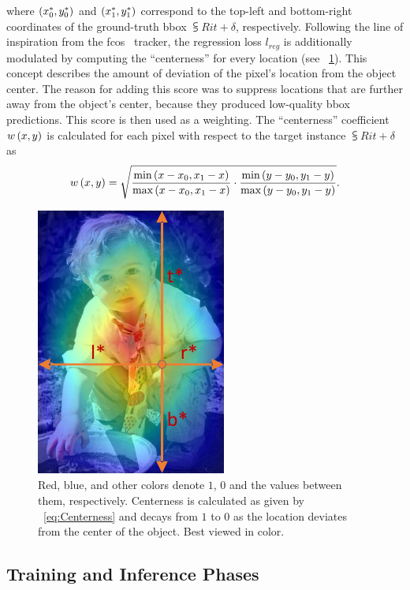 where $\left( {{x}_{0}^{*}, {y}_{0}^{*}} \right)$ and $\left( {{x}_{1}^{*}, {y}_{1}^{*}} \right)$ correspond to the top-left and bottom-right coordinates of the ground-truth \gls{bbox} $\subsup{R}{i}{t + \delta}$, respectively. Following the line of inspiration from the \gls{fcos}~\cite{tian2019fcos} tracker, the regression loss $l_{reg}$ is additionally modulated by computing the ``centerness'' for every location (see \figtext{}~\ref{fig:FCOSCenterness}). This concept describes the amount of deviation of the pixel's location from the object center. The reason for adding this score was to suppress locations that are further away from the object's center, because they produced low-quality \gls{bbox} predictions. This score is then used as a weighting. The ``centerness'' coefficient ${w} \left( x, y \right)$ is calculated for each pixel with respect to the target instance $\subsup{R}{i}{t + \delta}$ as
\begin{equation}
    \label{eq:Centerness}
    {w} \left( x, y \right) =
    \sqrt{
        \frac{\text{min} \left( x - x_0, x_1 - x \right)}{\text{max} \left( x - x_0, x_1 - x \right)}
        \cdot
        \frac{\text{min} \left( y - y_0, y_1 - y \right)}{\text{max} \left( y - y_0, y_1 - y \right)}
    }.
\end{equation}

\begin{figure}[t]
    \centerline{\includegraphics[width=0.2\linewidth]{figures/siamese_tracking/fcos_centerness.pdf}}
    \caption[Centerness visualization]{Red, blue, and other colors denote $1$, $0$ and the values between them, respectively. Centerness is calculated as given by \eqtext{}~\ref{eq:Centerness} and decays from $1$ to $0$ as the location deviates from the center of the object. Best viewed in color. }
    \label{fig:FCOSCenterness}
\end{figure}

\subsection{Training and Inference Phases}


